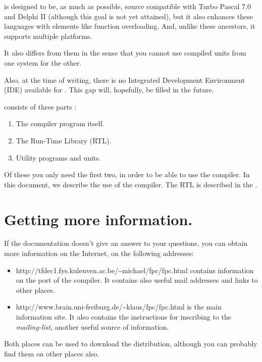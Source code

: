 \documentclass{report}
\begin{document}
\fpc is designed to be, as much as possible, source compatible with 
Turbo Pascal 7.0 and Delphi II (although this goal is not yet attained), 
but it also enhances these languages with elements like function overloading.
And, unlike these ancestors, it supports multiple platforms.

It also differs from them in the sense that you cannot use compiled units
from one system for the other.

Also, at the time of writing, there is no Integrated Development Environment
(IDE) available for \fpc. This gap will, hopefully, be filled in the future.

\fpc consists of three parts :
\begin{enumerate}
\item The compiler program itself.
\item The Run-Time Library (RTL).
\item Utility programs and units.
\end{enumerate}

Of these you only need the first two, in order to be able to use the compiler.
In this document, we describe the use of the compiler. The RTL is described in the
.

\section{Getting more information.}
If the documentation doesn't give an answer to your questions, 
you can obtain more information on the Internet, on the following addresses:
\begin{itemize}
\item
{}
{http://tfdec1.fys.kuleuven.ac.be/\~{}michael/fpc/fpc.html} contains information 
on the \linux port of the compiler. It contains also useful mail addresses and
links to other places.
\item
{}
{http://www.brain.uni-freiburg.de/\~{}klaus/fpc/fpc.html} is the main \fpc information site. 
It also contains the instructions for inscribing to the \textit{mailing-list}, 
another useful source of information.
\end{itemize}
Both places can be used to download the \fpc distribution, although you can 
probably find them on other places also.
\end{document}
